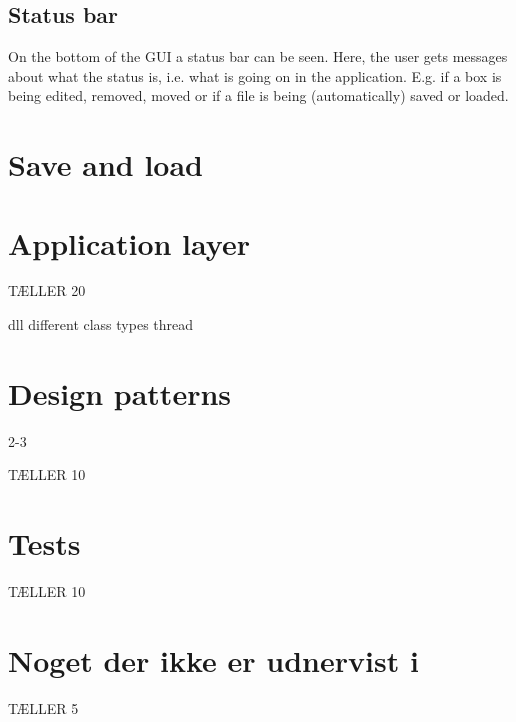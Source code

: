 \subsection{Status bar}

On the bottom of the GUI a status bar can be seen. Here, the user gets messages about what the status is, i.e. what is going on in the application. E.g. if a box is being edited, removed, moved or if a file is being (automatically) saved or loaded.

\section{Save and load}
\label{sec:design_pattern}

\section{Application layer}
\label{sec:app_layer}

TÆLLER 20

dll
different class types
thread

\section{Design patterns}
\label{sec:design_pattern}

2-3

TÆLLER 10


\section{Tests}
\label{sec:tests}

TÆLLER 10

\section{Noget der ikke er udnervist i}


TÆLLER 5